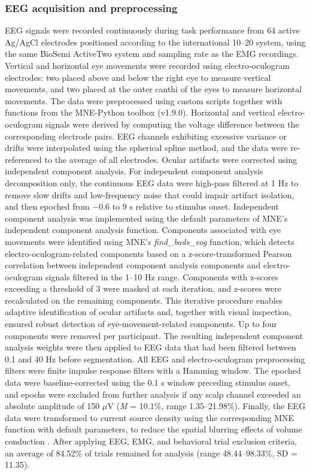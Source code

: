 \subsubsection{EEG acquisition and preprocessing}

EEG signals were recorded continuously during task performance from 64 active Ag/AgCl electrodes positioned according to the international 10--20 system, using the same BioSemi  ActiveTwo system and sampling rate as the EMG recordings.  Vertical and horizontal eye movements were recorded using electro-oculogram electrodes: two placed above and below the right eye to measure vertical movements, and two placed at the outer canthi of the eyes to measure horizontal movements. The data were preprocessed using custom scripts together with functions from the MNE-Python toolbox (v1.9.0). Horizontal and vertical electro-oculogram signals were derived by computing the voltage difference between the corresponding electrode pairs. EEG channels exhibiting  excessive variance or drifts were interpolated using the spherical spline method, and the data were re-referenced to the average of all electrodes.  Ocular artifacts were corrected using independent component analysis. For independent component analysis decomposition only, the continuous EEG data were high-pass filtered at 1 Hz to remove slow drifts and low-frequency noise that could impair artifact isolation, and then epoched from $-$0.6 to 9 s relative to stimulus onset. Independent component analysis was implemented using the default parameters of MNE's independent component analysis function. Components associated with eye movements were identified using MNE's  \emph{find\_bads\_eog}  function, which detects electro-oculogram-related components based on a z-score-transformed Pearson correlation between independent component analysis  components and electro-oculogram signals filtered in the 1--10 Hz range. Components with z-scores exceeding a threshold of 3 were masked at  each iteration, and z-scores were recalculated on the remaining components. This iterative procedure enables  adaptive identification of ocular artifacts and, together with visual inspection, ensured robust detection of eye-movement-related components. Up to four components were removed per participant.  The resulting independent component analysis  weights were then applied to  EEG data that had been filtered between 0.1 and 40 Hz before segmentation. All EEG and electro-oculogram  preprocessing filters were finite impulse response filters with a Hamming window. The epoched data were baseline-corrected using  the 0.1  s window preceding stimulus onset, and epochs were excluded from further analysis if any scalp channel exceeded an absolute amplitude of 150  $\mu$V  (\emph{M} = 10.1\%, range 1.35--21.98\%). Finally, the EEG data were transformed to current source density using the corresponding MNE function with default parameters, to reduce the spatial blurring effects of volume conduction \parencites[e.g.][]{kellyNeurocomputationalMechanismsPriorinformed2021}{kellyInternalExternalInfluences2013}{twomeyAbstractEffectorSelectiveDecision2016}. After applying EEG, EMG, and behavioral trial exclusion criteria, an average of 84.52\% of trials remained for analysis (range  48.44--98.33\%,  SD = 11.35).


